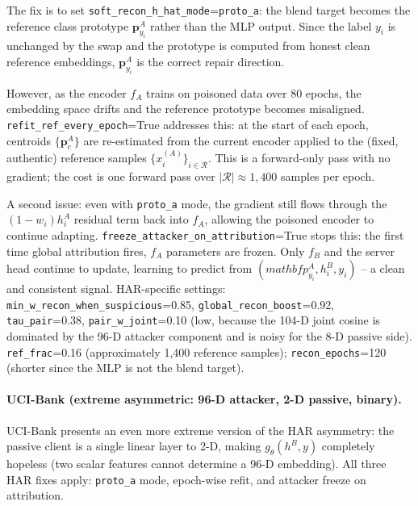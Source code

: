 \documentclass{article}
\begin{document}
The fix is to set \texttt{soft\_recon\_h\_hat\_mode}=\texttt{proto\_a}:
the blend target becomes the reference class prototype
$\mathbf{p}^A_{y_i}$ rather than the MLP output.
Since the label $y_i$ is unchanged by the swap and the prototype is computed
from honest clean reference embeddings, $\mathbf{p}^A_{y_i}$ is the correct
repair direction.

However, as the encoder $f_A$ trains on poisoned data over 80 epochs, the
embedding space drifts and the reference prototype becomes misaligned.
\texttt{refit\_ref\_every\_epoch}=True addresses this: at the start of each
epoch, centroids $\{\mathbf{p}^A_c\}$ are re-estimated from the current encoder
applied to the (fixed, authentic) reference samples $\{x_i^{(A)}\}_{i \in \mathcal{R}}$.
This is a forward-only pass with no gradient; the cost is one forward pass
over $|\mathcal{R}| \approx 1{,}400$ samples per epoch.

A second issue: even with \texttt{proto\_a} mode, the gradient still flows
through the $(1 - w_i) h^A_i$ residual term back into $f_A$, allowing the
poisoned encoder to continue adapting.
\texttt{freeze\_attacker\_on\_attribution}=True stops this: the first time
global attribution fires, $f_A$ parameters are frozen.
Only $f_B$ and the server head continue to update, learning to predict from
$(mathbf{p}^A_{y_i}, h^B_i, y_i)$ -- a clean and consistent signal.
HAR-specific settings: \texttt{min\_w\_recon\_when\_suspicious}=0.85,
\texttt{global\_recon\_boost}=0.92, \texttt{tau\_pair}=0.38,
\texttt{pair\_w\_joint}=0.10 (low, because the 104-D joint cosine is dominated
by the 96-D attacker component and is noisy for the 8-D passive side).
\texttt{ref\_frac}=0.16 (approximately 1,400 reference samples);
\texttt{recon\_epochs}=120 (shorter since the MLP is not the blend target).

\paragraph{UCI-Bank (extreme asymmetric: 96-D attacker, 2-D passive, binary).}
UCI-Bank presents an even more extreme version of the HAR asymmetry:
the passive client is a single linear layer to 2-D, making $g_\theta(h^B, y)$
completely hopeless (two scalar features cannot determine a 96-D embedding).
All three HAR fixes apply: \texttt{proto\_a} mode, epoch-wise refit,
and attacker freeze on attribution.
\end{document}
